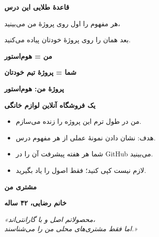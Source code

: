 \documentclass[14pt, a4paper, landscape]{extarticle}
\newcommand{\slide}[1]{%
    \newpage
    \begin{center}
    \begin{minipage}[t]{0.95\textwidth}
    \vspace{0.5cm}
    #1
    \vspace{0.5cm}
    \end{minipage}
    \end{center}
}
\newcommand{\slidetitle}[1]{%
    \begin{center}
        {\LARGE\bfseries\textcolor{primary}{#1}}
    \end{center}
    \vspace{0.5cm}
}
\newcommand{\myaccent}[1]{\textcolor{accent}{#1}}
\begin{document}
\slide{
    \slidetitle{قاعدهٔ طلایی این درس}
    \vspace{1.5cm}
    \begin{center}
        {\Large هر مفهوم را اول روی پروژهٔ من می‌بینید،}
        
        \vspace{0.5cm}
        
        {\Large بعد همان را روی پروژهٔ خودتان پیاده می‌کنید.}
        
        \vspace{2cm}
        
        {\Large\bfseries\myaccent{من = هوم‌استور}}
        
        \vspace{0.5cm}
        
        {\Large\bfseries\myaccent{شما = پروژهٔ تیم خودتان}}
    \end{center}
}

\slide{
    \slidetitle{پروژهٔ من: هوم‌استور}
    \vspace{0.5cm}
    \begin{center}
        {\Large\bfseries یک فروشگاه آنلاین لوازم خانگی}
    \end{center}
    
    \vspace{1cm}
    
    \begin{itemize}[itemsep=0.5em]
        \item من در طول ترم این پروژه را زنده می‌سازم.
        \item هدف: نشان دادن نمونهٔ عملی از هر مفهوم درس.
        \item شما هر هفته پیشرفت آن را در GitHub می‌بینید.
        \item لازم نیست کپی کنید؛ فقط اصول را یاد بگیرید.
    \end{itemize}
}

\slide{
    \slidetitle{مشتری من}
    \vspace{1cm}
    \begin{center}
        {\LARGE\bfseries\myaccent{خانم رضایی، ۴۲ ساله}}
        \par\vspace{1.5cm}
        {\Large\itshape «محصولاتم اصل و با گارانتی‌اند،\\
        اما فقط مشتری‌های محلی من را می‌شناسند.»}
    \end{center}
}
\end{document}
